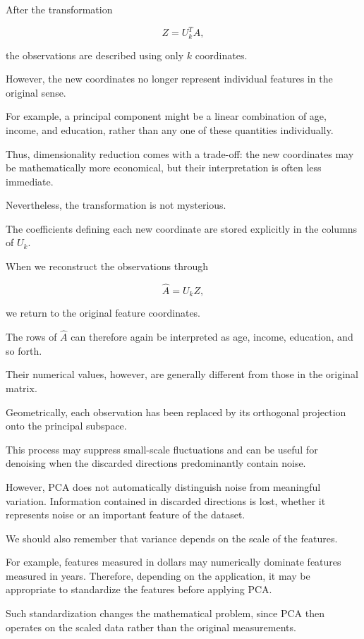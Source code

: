 \documentclass[11pt]{article}
\begin{document}
After the transformation

\[
Z=U_k^TA,
\]

the observations are described
using only $k$ coordinates.

However, the new coordinates
no longer represent individual
features in the original sense.

For example, a principal
component might be a linear
combination of age, income,
and education, rather than
any one of these quantities
individually.

Thus, dimensionality reduction
comes with a trade-off:
the new coordinates may be
mathematically more economical,
but their interpretation
is often less immediate.

Nevertheless, the transformation
is not mysterious.

The coefficients defining
each new coordinate are
stored explicitly in the
columns of $U_k$.

When we reconstruct the
observations through

\[
\widehat{A}=U_kZ,
\]

we return to the original
feature coordinates.

The rows of $\widehat{A}$
can therefore again be
interpreted as age, income,
education, and so forth.

Their numerical values,
however, are generally
different from those
in the original matrix.

Geometrically, each observation
has been replaced by its
orthogonal projection onto
the principal subspace.

This process may suppress
small-scale fluctuations
and can be useful for
denoising when the discarded
directions predominantly
contain noise.

However, PCA does not
automatically distinguish
noise from meaningful
variation. Information
contained in discarded
directions is lost,
whether it represents
noise or an important
feature of the dataset.

We should also remember
that variance depends
on the scale of the features.

For example, features measured
in dollars may numerically
dominate features measured
in years. Therefore, depending
on the application, it may
be appropriate to standardize
the features before applying PCA.

Such standardization changes
the mathematical problem,
since PCA then operates on
the scaled data rather than
the original measurements.
\end{document}
